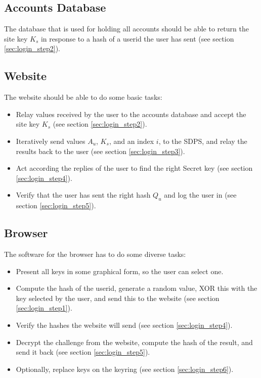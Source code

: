 \subsection{Accounts Database}
The database that is used for holding all accounts should be able to return the site key $K_s$ in response to a  hash of a userid the user has sent (see section \ref{sec:login_step2}).

\subsection{Website}
The website should be able to do some basic tasks:
\begin{itemize}
\item Relay values received by the user to the accounts database and accept the site key $K_s$ (see section \ref{sec:login_step2}).
\item Iteratively send values $A_u$, $K_s$, and an index $i$, to the SDPS, and relay the results back to the user (see section \ref{sec:login_step3}).
\item Act according the replies of the user to find the right Secret key (see section \ref{sec:login_step4}).
\item Verify that the user has sent the right hash $Q_u$ and log the user in (see section \ref{sec:login_step5}).
\end{itemize}

\subsection{Browser}
The software for the browser has to do some diverse tasks:
\begin{itemize}
\item Present all keys in some graphical form, so the user can select one.
\item Compute the  hash of the userid,
generate a random value,
XOR this with the key selected by the user,
and send this to the website (see section \ref{sec:login_step1}).
\item Verify the  hashes the website will send (see section \ref{sec:login_step4}).
\item Decrypt the challenge from the website,
compute the  hash of the result,
and send it back (see section \ref{sec:login_step5}).
\item Optionally, replace keys on the keyring (see section \ref{sec:login_step6}).
\end{itemize}
